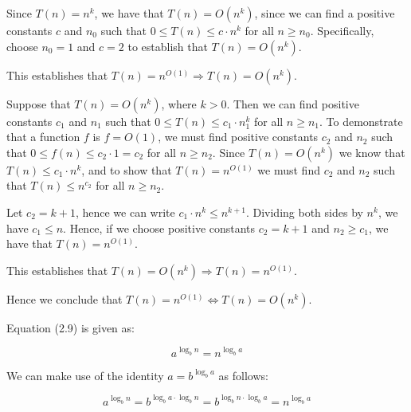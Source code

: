 \documentclass[a4paper,12pt]{article}
\begin{document}
Since $T(n) = n^k$, we have that $T(n) = O(n^k)$, since we can find a positive constants $c$ and $n_0$ such that $0 \le T(n) \le c \cdot n^k$ for all $n \ge n_0$. Specifically, choose $n_0=1$ and $c=2$ to establish that $T(n) = O(n^k)$. 

This establishes that $T(n) = n^{O(1)} \Rightarrow T(n) = O(n^k)$.

Suppose that $T(n) = O(n^k)$, where $k > 0$. Then we can find positive constants $c_1$ and $n_1$ such that $0 \le T(n) \le c_1\cdot n_1^k$ for all $n \ge n_1$. To demonstrate that a function $f$ is $f = O(1)$, we must find positive constants $c_2$ and $n_2$ such that $0 \le f(n) \le c_2 \cdot 1 = c_2$ for all $n \ge n_2$. Since $T(n) = O(n^k)$ we know that $T(n) \le c_1 \cdot n^k$, and to show that $T(n) = n^{O(1)}$ we must find $c_2$ and $n_2$ such that $T(n) \le n^{c_2}$ for all $n \ge n_2$. 

Let $c_2 = k+1$, hence we can write $c_1 \cdot n^k \le n^{k+1}$. Dividing both sides by $n^k$, we have $c_1 \le n$. Hence, if we choose positive constants $c_2 = k+1$ and $n_2 \ge c_1$, we have that $T(n) = n^{O(1)}$. 

This establishes that $T(n) = O(n^k) \Rightarrow T(n) = n^{O(1)}$.

\vspace{2mm}
Hence we conclude that $T(n) = n^{O(1)} \iff T(n) = O(n^k)$.

\vspace{2mm}

Equation (2.9) is given as:

\[ a^{\log_b n} = n^{\log_b a}\]

We can make use of the identity $a = b^{\log_b a}$ as follows:

\[ a^{\log_b n} = b^{\log_b a \cdot \log_b n} = b^{\log_b n \cdot \log_b a} = n^{\log_b a} \]

\vspace{2mm}
\end{document}
